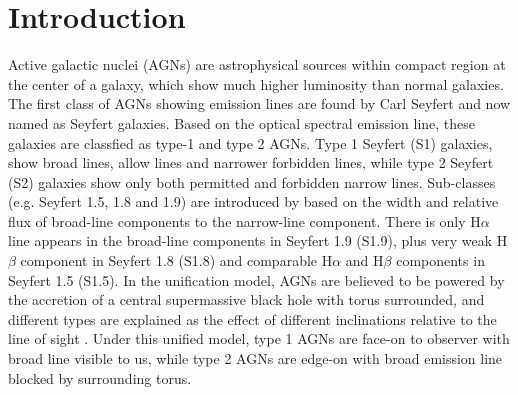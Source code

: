 \documentclass[twocolumn]{aastex63}
\begin{document}
\section{Introduction}\label{sec:intro} 

Active galactic nuclei (AGNs) are astrophysical sources within compact region at the center of a galaxy, which show much higher luminosity than normal galaxies. The first class of AGNs showing emission lines are found by Carl Seyfert and now named as Seyfert galaxies. Based on the optical spectral emission line, these galaxies are classfied as type-1 and type 2 AGNs. Type 1 Seyfert (S1) galaxies, show broad lines, allow lines and narrower forbidden lines, while type 2 Seyfert (S2) galaxies show only both permitted and forbidden narrow lines. Sub-classes (e.g. Seyfert 1.5, 1.8 and 1.9) are introduced by \citet{1976MNRAS.176P..61O,1981ApJ...249..462O} based on the width and relative flux of broad-line components to the narrow-line component. There is only H$\alpha$ line appears in the broad-line components in Seyfert 1.9 (S1.9), plus  
very weak H$\beta$ component in Seyfert 1.8 (S1.8) and comparable H$\alpha$ and H$\beta$ components in Seyfert 1.5 (S1.5). In the unification model, AGNs are believed to be powered by the accretion of a central supermassive black hole with torus surrounded, and different types are explained as the effect of different inclinations relative to the line of sight \citep[see][]{1993ARA&A..31..473A}. Under this unified model, type 1 AGNs are face-on to observer with broad line visible to us, while type 2 AGNs are edge-on with broad emission line blocked by surrounding torus.
\end{document}
